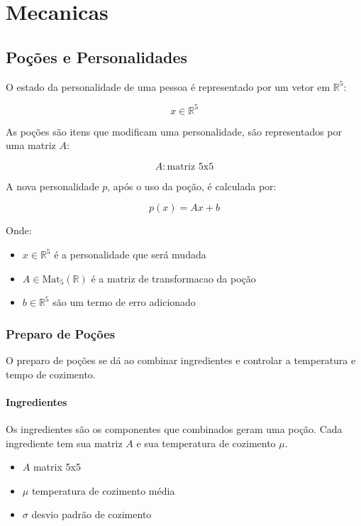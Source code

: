 \documentclass[12pt]{article}
\begin{document}
\newpage

\section{Mecanicas}

\subsection{Poções e Personalidades}

O estado da personalidade de uma pessoa é representado por um vetor em \(\mathbb{R}^5\):

\[
x \in \mathbb{R}^5
\]

As poções são itens que modificam uma personalidade, são representados por uma matriz \(A\):

\[A : \text{matriz 5x5}\]

A nova personalidade \(p\), após o uso da poção, é calculada por:

\[
p(x) = Ax + b
\]

Onde:
\begin{itemize}
    \item \(x \in \mathbb{R}^5\) é a personalidade que será mudada
    \item \(A \in \text{Mat}_5(\mathbb{R})\) é a matriz de transformacao da poção
    \item \(b \in \mathbb{R}^{5}\) são um termo de erro adicionado
\end{itemize}

\subsubsection{Preparo de Poções}

O preparo de poções se dá ao combinar ingredientes e controlar a temperatura e tempo de cozimento.

\paragraph{Ingredientes}

Os ingredientes são os componentes que combinados geram uma poção.
Cada ingrediente tem sua matriz \(A\) e sua temperatura de cozimento \(\mu\).

\begin{itemize}
    \item \(A\) matrix 5x5
    \item \(\mu\) temperatura de cozimento média
    \item \(\sigma\) desvio padrão de cozimento
\end{itemize}
\end{document}
